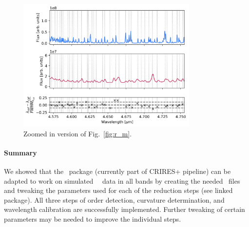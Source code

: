 \begin{figure}[!ht]
  \centering
  \includegraphics[width=0.8\textwidth]{figures/LSS_CrtAlg_files/Residuals_m_z.png}
  \caption{Zoomed in version of Fig.~\ref{fig:r_m}.
  }
  \label{fig:r_m_z}
\end{figure}




\paragraph{Summary}
We showed  that the \pyred~package (currently part of CRIRES+ pipeline) can be adapted to work on simulated \met~\lss~data in all bands by creating the needed \pyred~files and tweaking the parameters used for each of the reduction steps (see linked package). All three steps of order detection, curvature determination, and wavelength calibration are successfully implemented. Further tweaking of certain parameters may be needed to improve the individual steps.




